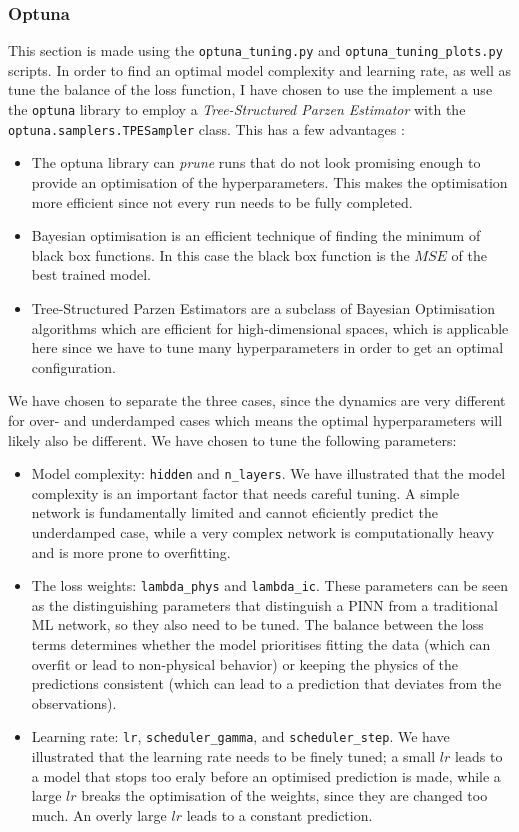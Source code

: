 \documentclass[we,twoside,openright,a4paper,11pt]{uantwerpenbamathesis}
\begin{document}
\subsubsection{Optuna}\label{ch:optuna_DHO}
This section is made using the \verb|optuna_tuning.py| and \verb|optuna_tuning_plots.py| scripts. In order to find an optimal model complexity and learning rate, as well as tune the balance of the loss function, I have chosen to use the implement a use the \verb|optuna| library to employ a \textit{Tree-Structured Parzen Estimator} with the \verb|optuna.samplers.TPESampler| class. This has a few advantages \cite{watanabe2025treestructuredparzenestimatorunderstanding}:
\begin{itemize}
    \item The optuna library can \textit{prune} runs that do not look promising enough to provide an optimisation of the hyperparameters. This makes the optimisation more efficient since not every run needs to be fully completed.
    \item Bayesian optimisation is an efficient technique of finding the minimum of black box functions. In this case the black box function is the $MSE$ of the best trained model.
    \item Tree-Structured Parzen Estimators are a subclass of Bayesian Optimisation algorithms which are efficient for high-dimensional spaces, which is applicable here since we have to tune many hyperparameters in order to get an optimal configuration.
\end{itemize}
We have chosen to separate the three cases, since the dynamics are very different for over- and underdamped cases which means the optimal hyperparameters will likely also be different. We have chosen to tune the following parameters:
\begin{itemize}
    \item Model complexity: \texttt{hidden} and \texttt{n\_layers}. We have illustrated that the model complexity is an important factor that needs careful tuning. A simple network is fundamentally limited and cannot eficiently predict the underdamped case, while a very complex network is computationally heavy and is more prone to overfitting.
    \item The loss weights: \texttt{lambda\_phys} and \texttt{lambda\_ic}. These parameters can be seen as the distinguishing parameters that distinguish a PINN from a traditional ML network, so they also need to be tuned. The balance between the loss terms determines whether the model prioritises fitting the data (which can overfit or lead to non-physical behavior) or keeping the physics of the predictions consistent (which can lead to a prediction that deviates from the observations).
    \item Learning rate: \texttt{lr}, \texttt{scheduler\_gamma}, and \texttt{scheduler\_step}. We have illustrated that the learning rate needs to be finely tuned; a small $lr$ leads to a model that stops too eraly before an optimised prediction is made, while a large $lr$ breaks the optimisation of the weights, since they are changed too much. An overly large $lr$ leads to a constant prediction.
\end{itemize}
\end{document}
